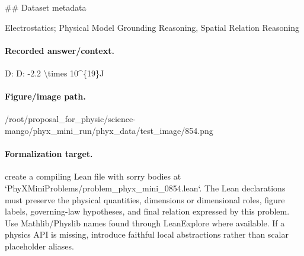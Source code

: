 \#\# Dataset metadata

Electrostatics; Physical Model Grounding Reasoning, Spatial Relation Reasoning

\paragraph{Recorded answer/context.}
D: D: -2.2 \textbackslash{}times 10\textasciicircum{}\{19\}J

\paragraph{Figure/image path.}
/root/proposal\_for\_physic/science-mango/phyx\_mini\_run/phyx\_data/test\_image/854.png

\paragraph{Formalization target.}
create a compiling Lean file with sorry bodies at `PhyXMiniProblems/problem\_phyx\_mini\_0854.lean`. The Lean declarations must preserve the physical quantities, dimensions or dimensional roles, figure labels, governing-law hypotheses, and final relation expressed by this problem.
Use Mathlib/Physlib names found through LeanExplore where available. If a physics API is missing, introduce faithful local abstractions rather than scalar placeholder aliases.

